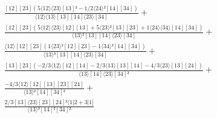 \documentclass[varwidth, border=5pt]{standalone}
\begin{document}
\begin{my}
$\begin{gathered}
\scriptscriptstyle\frac{[12][23](5⟨12⟩⟨23⟩[13]²-1/2⟨24⟩²[14][34])}{⟨12⟩⟨13⟩[13][14]⟨23⟩[34]} +\\
\scriptscriptstyle\frac{[12][23](5⟨12⟩⟨23⟩[12][13]+5⟨23⟩²[13][23]+1⟨24⟩⟨34⟩[14][34])}{⟨13⟩²[13][14]⟨23⟩[34]} +\\
\scriptscriptstyle\frac{⟨12⟩[12][23](1⟨23⟩²[12][23]-1⟨34⟩²[14][34])}{⟨13⟩³[13][14]⟨23⟩[34]} +\\
\scriptscriptstyle\frac{[13][23](-2/3⟨12⟩[12][14]-2/3⟨13⟩[13][14]-4/3⟨23⟩[13][24])}{⟨13⟩[14]⟨23⟩[34]²} +\\
\scriptscriptstyle\frac{-4/3⟨12⟩[12][13][23][24]}{⟨13⟩²[14][34]²} +\\
\scriptscriptstyle\frac{2/3[13]⟨23⟩[23][24]²⟨1|2+3|1]}{⟨13⟩³[14]²[34]²} \phantom{+}
\end{gathered}$
\end{my}
\end{document}
